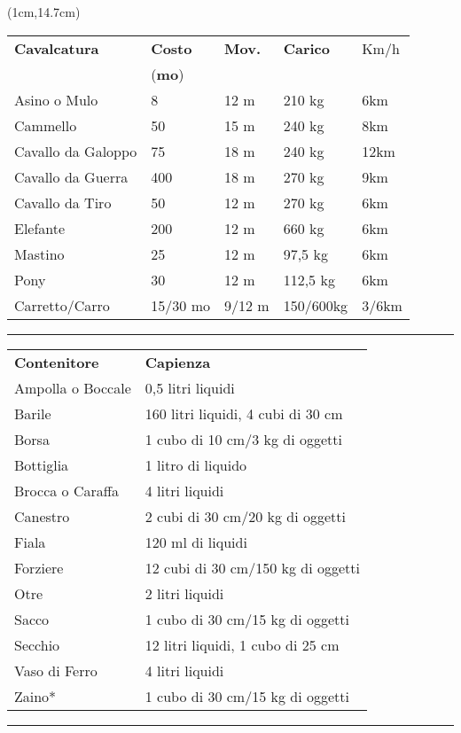\documentclass[a4paper,12 pt,openany]{book}
\newcommand{\riga}{\rule{\textwidth}{0.4pt}}
\begin{document}
\begin{textblock*}{12cm}(1cm,14.7cm) %

\begin{tabular}{lllll}
\hline
\textbf{Cavalcatura}&\textbf{Costo}&\textbf{Mov.}&\textbf{Carico}&Km/h\\
&(\textbf{mo})&&&\\
Asino o Mulo&8&12 m&210 kg&6km\\
Cammello&50&15 m&240 kg&8km\\
Cavallo da Galoppo&75&18 m&240 kg&12km\\
Cavallo da Guerra&400&18 m&270 kg&9km\\
Cavallo da Tiro&50&12 m&270 kg&6km\\
Elefante&200&12 m&660 kg&6km\\
Mastino&25&12 m&97,5 kg&6km\\
Pony&30&12 m&112,5 kg&6km\\
Carretto/Carro    & 15/30 mo & 9/12 m   &150/600kg    & 3/6km              \\
\end{tabular}

\riga

\begin{tabular}{ll}

\textbf{Contenitore}&\textbf{Capienza}\\
Ampolla o Boccale&0,5 litri liquidi\\
Barile&			160 litri liquidi, 4 cubi di 30 cm\\
Borsa&			1 cubo di 10 cm/3 kg di oggetti\\
Bottiglia&		1 litro di liquido\\
Brocca o Caraffa&4 litri liquidi\\
Canestro&		2 cubi di 30 cm/20 kg di oggetti\\
Fiala&			120 ml di liquidi\\
Forziere&		12 cubi di 30 cm/150 kg di oggetti\\
Otre&			2 litri liquidi\\
Sacco&			1 cubo di 30 cm/15 kg di oggetti\\
Secchio&		12 litri liquidi, 1 cubo di 25 cm\\
Vaso di Ferro&	4 litri liquidi\\
Zaino*&			1 cubo di 30 cm/15 kg di oggetti\\
\end{tabular}


\riga



\end{textblock*}
\end{document}

